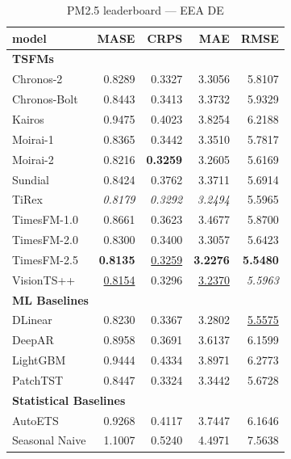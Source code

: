 \begin{table}[H]
\caption{PM2.5 leaderboard --- EEA DE}
\centering
\begin{small}
\begin{tabular}{lrrrr}
\toprule
model & MASE & CRPS & MAE & RMSE \\
\midrule
\multicolumn{5}{l}{\textbf{TSFMs}} \\
Chronos-2 & 0.8289 & 0.3327 & 3.3056 & 5.8107 \\
Chronos-Bolt & 0.8443 & 0.3413 & 3.3732 & 5.9329 \\
Kairos & 0.9475 & 0.4023 & 3.8254 & 6.2188 \\
Moirai-1 & 0.8365 & 0.3442 & 3.3510 & 5.7817 \\
Moirai-2 & 0.8216 & \textbf{0.3259} & 3.2605 & 5.6169 \\
Sundial & 0.8424 & 0.3762 & 3.3711 & 5.6914 \\
TiRex & \textit{0.8179} & \textit{0.3292} & \textit{3.2494} & 5.5965 \\
TimesFM-1.0 & 0.8661 & 0.3623 & 3.4677 & 5.8700 \\
TimesFM-2.0 & 0.8300 & 0.3400 & 3.3057 & 5.6423 \\
TimesFM-2.5 & \textbf{0.8135} & \underline{0.3259} & \textbf{3.2276} & \textbf{5.5480} \\
VisionTS++ & \underline{0.8154} & 0.3296 & \underline{3.2370} & \textit{5.5963} \\
\midrule
\multicolumn{5}{l}{\textbf{ML Baselines}} \\
DLinear & 0.8230 & 0.3367 & 3.2802 & \underline{5.5575} \\
DeepAR & 0.8958 & 0.3691 & 3.6137 & 6.1599 \\
LightGBM & 0.9444 & 0.4334 & 3.8971 & 6.2773 \\
PatchTST & 0.8447 & 0.3324 & 3.3442 & 5.6728 \\
\midrule
\multicolumn{5}{l}{\textbf{Statistical Baselines}} \\
AutoETS & 0.9268 & 0.4117 & 3.7447 & 6.1646 \\
Seasonal Naive & 1.1007 & 0.5240 & 4.4971 & 7.5638 \\
\bottomrule
\end{tabular}
\end{small}
\end{table}